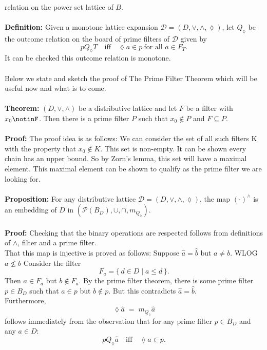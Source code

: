 \documentclass[12pt]{article}
\begin{document}
relation on the power set lattice of $B$. \\ \\
\textbf{Definition:}  
Given a monotone lattice expansion $\mathcal{D} = (D, \vee, \wedge, \lozenge)$,  
let $Q_{\lozenge}$ be the outcome relation on the board of prime filters of $\mathcal{D}$ given by
\[
p Q_{\lozenge} T \quad \text{iff} \quad \lozenge a \in p \ \text{for all } a \in F_{T}.
\]
It can be checked this outcome relation is monotone. \\ \\
Below we state and sketch the proof of The Prime Filter Theorem which will be useful now and what is to come. \\ \\
\textbf{Theorem:} $(D,\vee,\wedge)$ be a distributive lattice and let $F$ be a filter with $x_0\notinF$. 
Then there is a prime filter $P$ such that $x_0\notin P$ and $F\subseteq P$.\\ \\
\textbf{Proof:} The proof idea is as follows: We can consider the set of all such filters K with the property that $x_0 \notin K $. This set is non-empty. It can be shown every chain has an upper bound. So by Zorn's lemma, this set will have a maximal element. This maximal element can be shown to qualify as the prime filter we are looking for. \\ \\
\textbf{Proposition:} For any distributive lattice $\mathcal{D}=(D, \vee, \wedge, \lozenge)$, the map $(\cdot)^{\wedge}$ is an embedding of $D$ in 
$(\mathcal{P}(B_D), \cup, \cap,m_{Q_{\lozenge}})$. \\ \\
\textbf{Proof:} Checking that the binary operations are respected follows from definitions of $\wedge$, filter and a prime filter. \\
That this map is injective is proved as follows:  
Suppose $\widehat{a} = \widehat{b}$ but $a \neq b$. WLOG $a \nleq b$
Consider the filter 
\[
F_{a} = \{\, d \in D \mid a \leq d \,\}.
\]
Then $a \in F_{a}$ but $b \notin F_{a}$.  
By the prime filter theorem, there is some prime filter $p \in B_{D}$ such that  
$a \in p$ but $b \notin p$.  
But this contradicts $\widehat{a} = \widehat{b}$. \\
Furthermore, 
\[
\lozenge \widehat{a} \;=\; m_{Q_{\lozenge}} \widehat{a}
\]
follows immediately from the observation that for any prime filter $p \in B_{D}$ and any $a \in D$:  
\[
p Q_{\lozenge} \widehat{a} \quad \text{iff} \quad \lozenge a \in p.
\]
\end{document}
